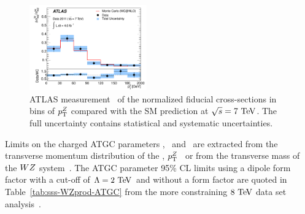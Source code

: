 \begin{figure}[htbp]
  \begin{center}
  \includegraphics[width=0.45\textwidth]{figures/sss-inclboson-diboson-wzprod-ptZ.pdf}
  \caption{ATLAS measurement~\cite{Aad:2012twa} of the normalized fiducial cross-sections in bins of $p_{\mathrm{T}}^Z$ compared with the SM prediction at $\rts = 7\TeV$. The full uncertainty contains statistical and systematic uncertainties.}
\label{fig:sss-WZprod-ptZ-det}
\end{center}
\end{figure}


Limits on the charged ATGC parameters \dkz, \lz\ and \gz\ are extracted from the transverse momentum distribution
of the \Zboson, $p_{\mathrm{T}}^Z$~\cite{Aad:2012twa} or from the transverse mass of the $WZ$ system~\cite{Aad:2016ett}. 
The ATGC parameter 95\% CL limits using a dipole form factor with a cut-off of $\Lambda=2\TeV$ and without a form factor are quoted 
in Table~\ref{tab:sss-WZprod-ATGC} from the more constraining $8\TeV$ data set analysis~\cite{Aad:2016ett}.



